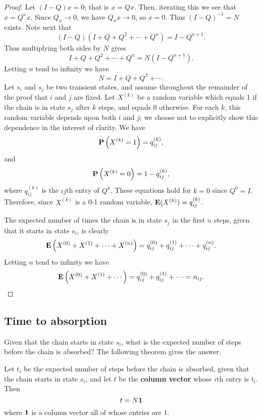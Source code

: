 \begin{proof}
Let $(I-Q)x = 0$; that is $x = Qx$. Then, iterating this we see that $x = Q^n x$. Since $Q_n \to 0$, we have $Q_n x \to 0$, so $x = 0$. Thus $(I-Q)^{-1} = N$
exists. Note next that
\begin{equation*}
    (I-Q)(I+Q + Q^2 + \cdots + Q^n) = I - Q^{n+1}.
\end{equation*}
Thus multiplying both sides by $N$ gives
\begin{equation*}
    I + Q + Q^2 + \cdots + Q^n = N(I-Q^{n+1}) .
\end{equation*}
Letting $n$ tend to infinity we have
\begin{equation*}
    N = I + Q + Q^2 + \cdots .
\end{equation*}
Let $s_i$ and $s_j$ be two transient states, and assume throughout the remainder of the proof that $i$ and $j$ are fixed. Let $X^{(k)}$ be a random variable which equals 1 if the chain is in state $s_j$ after $k$ steps, and equals 0 otherwise. For each $k$, this random variable depends upon both $i$ and $j$; we choose not to explicitly show this dependence in the interest of clarity. We have
\begin{equation*}
    \mathbf{P} \left(X^{(k)}=1\right)=q_{i j}^{(k)},
\end{equation*}
and 
\begin{equation*}
    \mathbf{P} \left(X^{(k)}=0\right)=1-q_{i j}^{(k)},
\end{equation*}
where $q_{i j}^{(k)}$ is the $ij$th entry of $Q^k$. These equations hold for $k = 0$ since $Q^0 = I$. Therefore, since $X^{(k)}$ is a 0-1 random variable, $\mathbf{E}(X^{(k)}) = q_{i j}^{(k)}$.

The expected number of times the chain is in state $s_j$ in the first $n$ steps, given that it starts in state $s_i$, is clearly
\begin{equation*}
    \mathbf{E}\left(X^{(0)}+X^{(1)}+\cdots+X^{(n)}\right)=q_{i j}^{(0)}+q_{i j}^{(1)}+\cdots+q_{i j}^{(n)}.
\end{equation*}
Letting $n$ tend to infinity we have
\begin{equation*}
    \mathbf{E}\left(X^{(0)}+X^{(1)}+\cdots\right)=q_{i j}^{(0)}+q_{i j}^{(1)}+\cdots=n_{i j}.
\end{equation*}
\end{proof}


\subsection{Time to absorption}
Given that the chain starts in state $s_i$, what is the expected number of steps before the chain is absorbed? The following theorem gives the answer.
\begin{theorem}
Let $t_i$ be the expected number of steps before the chain is absorbed, given that the chain starts in state $s_i$, and let $t$ be the \textbf{column vector} whose $i$th entry is $t_i$. Then
\begin{equation*}
    t = N \mathbf{1}
\end{equation*}
where $\mathbf{1}$ is a column vector all of whose entries are 1.
\end{theorem}

